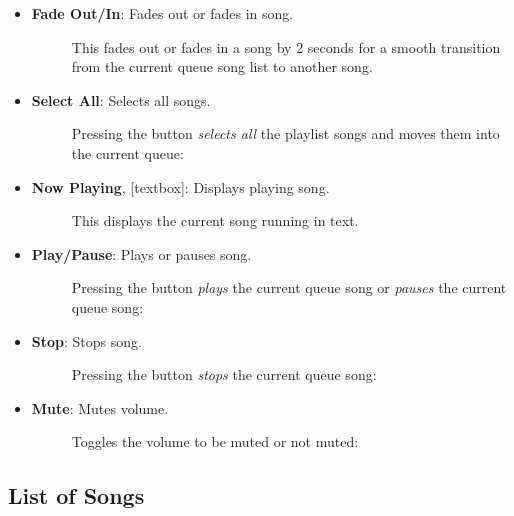 \documentclass{article}
\begin{document}
\begin{itemize}
    \item \textbf{Fade Out/In}: Fades out or fades in song.
    \begin{description}
        \item[] This fades out or fades in a song by 2 seconds for a smooth transition from the current queue song list to another song.
    \end{description}
    \item \textbf{Select All}: Selects all songs.
    \begin{description}
        \item[] Pressing the button \textit{selects all} the playlist songs and moves them into the current queue: 
    \end{description}
    \item \textbf{Now Playing}, [textbox]: Displays playing song.
    \begin{description}
        \item[] This displays the current song running in text.
    \end{description}
    \item \textbf{Play/Pause}: Plays or pauses song.
    \begin{description}
        \item[] Pressing the button \textit{plays} the current queue song or \textit{pauses} the current queue song:  
    \end{description}
    \item \textbf{Stop}: Stops song.
    \begin{description}
        \item[] Pressing the button \textit{stops} the current queue song: 
    \end{description}
    \item \textbf{Mute}: Mutes volume.
    \begin{description}
        \item[] Toggles the volume to be muted or not muted: 
    \end{description}

\end{itemize}

\subsection{List of Songs}
\end{document}
